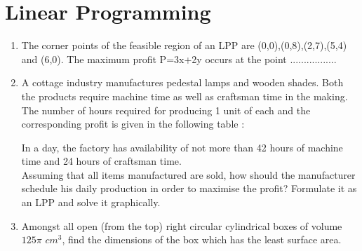 \documentclass[journal,12pt,twocolumn]{IEEEtran}
\begin{document}
 \section{Linear Programming}
\begin{enumerate}
\item  The corner points of the feasible region of an LPP are (0,0),(0,8),(2,7),(5,4) and (6,0). The maximum profit P=3x+2y occurs at the point .................\\
\item A cottage industry manufactures pedestal lamps and wooden shades. Both the products require machine time as well as craftsman time in the making. The number of hours required for producing 1 unit of each and the corresponding profit is given in the following table :
\begin{table}[htb]
\tiny
\caption{}
\end{table}
In a day, the factory has availability of not more than 42 hours of machine time and 24 hours of craftsman time.\\
Assuming that all items manufactured are sold, how should the manufacturer schedule his daily production in order to maximise the profit? Formulate it as an LPP and solve it graphically.\\
 \item Amongst all open (from the top) right circular cylindrical boxes of volume $125 \pi $ $cm^3$, find the dimensions of the box which has the least surface area.\\  

\end{enumerate}
\end{document}
